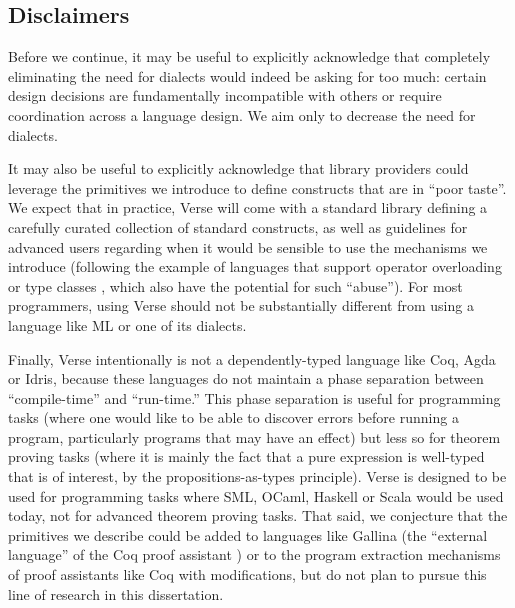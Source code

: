 \subsection{Disclaimers}
Before we continue, it may be useful to explicitly acknowledge that completely eliminating the need for dialects would indeed be asking for too much: certain design decisions are fundamentally incompatible with others or require coordination across a language design. We aim only to decrease the need for dialects.%

It may also be useful to explicitly acknowledge that library providers could leverage the primitives we introduce   to define constructs that are in ``poor taste''. We  expect that in practice, Verse will come with a standard library defining a carefully curated collection of standard constructs, as well as guidelines for advanced users regarding when it would be sensible to use the mechanisms we introduce (following the example of languages that support operator overloading or type classes \cite{Hall:1996:TCH:227699.227700}, which also have the potential for such ``abuse''). For most programmers, using Verse should not be substantially different from using a language like ML or one of its dialects.%

Finally, Verse intentionally is not a dependently-typed language like Coq, Agda or Idris, because these languages do not maintain a phase separation between ``compile-time'' and ``run-time.'' This phase separation is useful for programming tasks (where one would like to be able to discover errors before running a program, particularly programs that may have an effect) but less so for theorem proving tasks (where it is mainly the fact that a pure expression is well-typed that is of interest, by the propositions-as-types principle). Verse is designed to be used for programming tasks where SML, OCaml, Haskell or Scala would be used today, not for advanced theorem proving tasks. That said, we conjecture that the primitives we describe could be added to languages like Gallina (the ``external language'' of the Coq proof assistant  \cite{Coq:manual}) or to the program extraction mechanisms of proof assistants like Coq with  modifications, but do not plan to pursue this line of research in this dissertation. %

